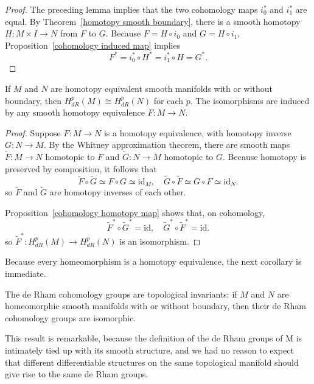 \begin{proof}
The preceding lemma implies that the two cohomology maps $i_0^*$ and $i_1^*$ are equal. By Theorem~\ref{homotopy smooth boundary}, there is a smooth homotopy $H:M\times I\to N$ from $F$ to $G$. Because $F=H\circ i_0$ and $G=H\circ i_1$, Proposition~\ref{cohomology induced map} implies
\[F^*=i_0^*\circ H^*=i_1^*\circ H=G^*.\]
\end{proof}
\begin{theorem}
If $M$ and $N$ are homotopy equivalent smooth manifolds with or without boundary, then $H^p_{dR}(M)\cong H^p_{dR}(N)$ for each $p$. The isomorphisms are induced by any smooth homotopy equivalence $F:M\to N$.
\end{theorem}
\begin{proof}
Suppose $F:M\to N$ is a homotopy equivalence, with homotopy inverse $G:N\to M$. By the Whitney approximation theorem, there are smooth maps $\widetilde{F}:M\to N$ homotopic to $F$ and $\widetilde{G}:N\to M$ homotopic to $G$. Because homotopy is preserved by composition, it follows that 
\[\widetilde{F}\circ\widetilde{G}\simeq F\circ G\simeq\mathrm{id}_M,\quad \widetilde{G}\circ\widetilde{F}\simeq G\circ F\simeq\mathrm{id}_N.\]
so $\widetilde{F}$ and $\widetilde{G}$ are homotopy inverses of each other.\par
Proposition~\ref{cohomology homotopy map} shows that, on cohomology,
\[\widetilde{F}^*\circ\widetilde{G}^*=\mathrm{id},\quad \widetilde{G}^*\circ\widetilde{F}^*=\mathrm{id}.\]
so $\widetilde{F}^*:H^p_{dR}(M)\to H^p_{dR}(N)$ is an isomorphism.
\end{proof}
Because every homeomorphism is a homotopy equivalence, the next corollary is immediate.
\begin{corollary}
The de Rham cohomology groups are topological invariants: if $M$ and $N$ are homeomorphic smooth manifolds with or without boundary, then their de Rham cohomology
groups are isomorphic.
\end{corollary}
This result is remarkable, because the definition of the de Rham groups of M
is intimately tied up with its smooth structure, and we had no reason to expect that
different differentiable structures on the same topological manifold should give rise
to the same de Rham groups.
